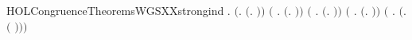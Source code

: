 \newcommand{\HOLCongruenceTheoremsWGSXXrules}{\UseVerbatim{HOLCongruenceTheoremsWGSXXrules}}
\begin{SaveVerbatim}{HOLCongruenceTheoremsWGSXXstrongind}
\HOLTokenTurnstile{} \HOLSymConst{\HOLTokenForall{}}.
       \ensuremath{(}\HOLSymConst{\HOLTokenForall{}}.  \ensuremath{(}\HOLTokenLambda{}. \ensuremath{)}\ensuremath{)} \HOLSymConst{\HOLTokenConj{}}
       \ensuremath{(}\HOLSymConst{\HOLTokenForall{}} .   \HOLSymConst{\HOLTokenImp{}}  \ensuremath{(}\HOLTokenLambda{}. \HOLSymConst{\ensuremath{\ldotp}} \ensuremath{)}\ensuremath{)} \HOLSymConst{\HOLTokenConj{}}
       \ensuremath{(}\HOLSymConst{\HOLTokenForall{}}   .
              \HOLSymConst{\HOLTokenConj{}}   \HOLSymConst{\HOLTokenImp{}}
             \ensuremath{(}\HOLTokenLambda{}. \HOLSymConst{\ensuremath{\ldotp}}  \HOLSymConst{\ensuremath{+}} \HOLSymConst{\ensuremath{\ldotp}} \ensuremath{)}\ensuremath{)} \HOLSymConst{\HOLTokenConj{}}
       \ensuremath{(}\HOLSymConst{\HOLTokenForall{}} .
              \HOLSymConst{\HOLTokenConj{}}   \HOLSymConst{\HOLTokenConj{}}   \HOLSymConst{\HOLTokenConj{}}   \HOLSymConst{\HOLTokenImp{}}
             \ensuremath{(}\HOLTokenLambda{}.   \HOLSymConst{\ensuremath{\mid}}  \ensuremath{)}\ensuremath{)} \HOLSymConst{\HOLTokenConj{}}
       \ensuremath{(}\HOLSymConst{\HOLTokenForall{}} .   \HOLSymConst{\HOLTokenConj{}}   \HOLSymConst{\HOLTokenImp{}}  \ensuremath{(}\HOLTokenLambda{}.   \ensuremath{(} \ensuremath{)}\ensuremath{)}\ensuremath{)} \HOLSymConst{\HOLTokenConj{}}

\end{SaveVerbatim}
